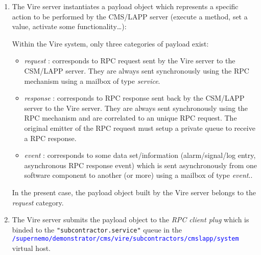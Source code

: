 \begin{enumerate}

\item The Vire  server instantiates a payload object  which represents a
  specific action to be performed by the CMS/LAPP server (execute a method, set a value,
  activate some functionality\dots):
  \vskip 10pt
  \begin{center}
    \scalebox{0.5}{}
  \end{center}

  \noindent Within the  Vire system, only three  categories of payload
  exist:

  \begin{itemize}

  \item \emph{request} :  corresponds to RPC request sent  by the Vire
    server to the CSM/LAPP server.  They are always sent synchronously
    using the RPC mechanism using a mailbox of type \emph{service}.

  \item \emph{response} : corresponds to RPC response sent back by the
    CSM/LAPP  server  to  the  Vire   server.  They  are  always  sent
    synchronously using the  RPC mechanism and are  correlated to an
    unique RPC request. The original emitter of the RPC request must setup a private
    queue to receive a RPC response.

  \item  \emph{event}  :  corresponds  to  some  data  set/information
    (alarm/signal/log entry, asynchronous RPC response event)  which is  sent asynchronously
    from one software component to another (or more) using a mailbox of type \emph{event}..

  \end{itemize}

  \noindent In the present case, the  payload object built by the Vire
  server belongs to the \emph{request} category.

\item  The Vire  server submits  the  payload object  to the  \emph{RPC
  client       plug}      which       is      binded       to      the
  \texttt{"subcontractor.service"}       queue      in       the\\
  \textcolor{blue}{\texttt{/supernemo/demonstrator/cms/vire/subcontractors/cmslapp/system}}     virtual
  host.
  \vskip 10pt
  \begin{center}
    \scalebox{0.5}{}
  \end{center}



\end{enumerate}
